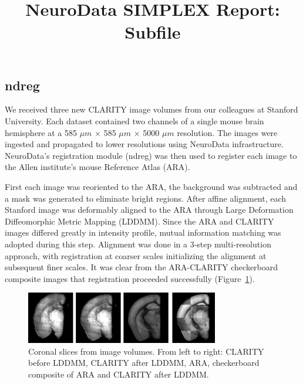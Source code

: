 \documentclass[simplex.tex]{subfiles}
\title{NeuroData SIMPLEX Report: Subfile}
\begin{document}


\subsection{ndreg}

We received three new CLARITY image volumes from our colleagues at Stanford University. 
Each dataset contained two channels of a single mouse brain hemisphere at a 585 $\mu m$ $\times$ 585 $\mu m$ $\times$ 5000 $\mu m$ resolution.
The images were ingested and propagated to lower resolutions using NeuroData infrastructure.
NeuroData's registration module (ndreg) was then used to register each image to the Allen institute's mouse Reference Atlas (ARA).

First each image was reoriented to the ARA, the background was subtracted and a mask was generated to eliminate bright regions.
After affine alignment, each Stanford image was deformably aligned to the ARA through Large Deformation Diffeomorphic Metric Mapping (LDDMM).
Since the ARA and CLARITY images differed greatly in intensity profile, mutual information matching was adopted during this step.
Alignment was done in a 3-step multi-resolution approach, with registration at coarser scales initializing the alignment at subsequent finer scales.
It was clear from the ARA-CLARITY checkerboard composite images that registration proceeded successfully (Figure~\ref{fig:ndregAiley}).

\begin{figure}[h!]
\begin{cframed}
\centering
\includegraphics[width=0.75\textwidth]{../../figs/ndreg-ailey.png}
\caption{
  Coronal slices from image volumes.
  From left to right: CLARITY before LDDMM, CLARITY after LDDMM, ARA, checkerboard composite of ARA and CLARITY after LDDMM.
}
\label{fig:ndregAiley}
\end{cframed}
\end{figure}
\end{document}
